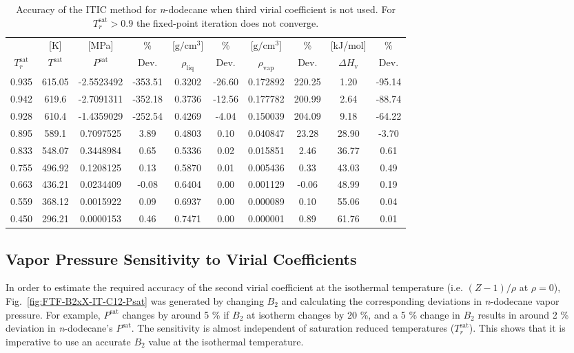 \documentclass[5p,times]{elsarticle}
\begin{document}
\begin{table}[]
\centering
\caption{Accuracy of the ITIC method for \textit{n}-dodecane when third virial coefficient is not used. For $T_r^{\mathrm{sat}}>0.9$ the fixed-point iteration does not converge.}
\label{tab:NIST-VAL-C12-FTF}
\begin{tabular}{cccccccccc}
 & {[}K{]} &	 {[}MPa{]} &	 \% 	& {[}$\mathrm{g/cm^3}${]} & \% & {[}$\mathrm{g/cm^3}${]} & \% 	& {[}kJ/mol{]} & \% \\
$T_r^{\mathrm{sat}}$ & $T^{\mathrm{sat}}$ & $P^{\mathrm{sat}}$ & Dev. & $\rho_{\mathrm{liq}}$ &	 Dev. & $\rho_{\mathrm{vap}}$ & Dev. & $\Delta H_{\mathrm{v}}$ & Dev. \\
\hline
0.935 & 615.05 & -2.5523492 & -353.51 & 0.3202 & -26.60 & 0.172892 & 220.25 & 1.20  & -95.14 \\
0.942 & 619.6  & -2.7091311 & -352.18 & 0.3736 & -12.56 & 0.177782 & 200.99 & 2.64  & -88.74 \\
0.928 & 610.4  & -1.4359029 & -252.54 & 0.4269 & -4.04  & 0.150039 & 204.09 & 9.18  & -64.22 \\
0.895 & 589.1  & 0.7097525  & 3.89    & 0.4803 & 0.10   & 0.040847 & 23.28  & 28.90 & -3.70  \\
0.833 & 548.07 & 0.3448984  & 0.65    & 0.5336 & 0.02   & 0.015851 & 2.46   & 36.77 & 0.61   \\
0.755 & 496.92 & 0.1208125  & 0.13    & 0.5870 & 0.01   & 0.005436 & 0.33   & 43.03 & 0.49   \\
0.663 & 436.21 & 0.0234409  & -0.08   & 0.6404 & 0.00   & 0.001129 & -0.06  & 48.99 & 0.19   \\
0.559 & 368.12 & 0.0015922  & 0.09    & 0.6937 & 0.00   & 0.000089 & 0.10   & 55.06 & 0.04   \\
0.450 & 296.21 & 0.0000153  & 0.46    & 0.7471 & 0.00   & 0.000001 & 0.89   & 61.76 & 0.01  \\
\end{tabular}

\end{table}

\subsection{Vapor Pressure Sensitivity to Virial Coefficients} \label{sec:Bx-Sensitivity}
In order to estimate the required accuracy of the second virial coefficient at the isothermal temperature (i.e. $(Z-1)/\rho$ at $\rho=0$), Fig.~\ref{fig:FTF-B2xX-IT-C12-Psat} was generated by changing $B_2$ and calculating the corresponding deviations in \textit{n}-dodecane vapor pressure. For example, $P^{\mathrm{sat}}$ changes by around 5 \% if $B_2$ at isotherm changes by 20 \%, and a 5 \% change in $B_2$ results in around 2 \% deviation in \textit{n}-dodecane's $P^{\mathrm{sat}}$. The sensitivity is almost independent of saturation reduced temperatures ($T_r^{\mathrm{sat}}$). This shows that it is imperative to use an accurate $B_2$ value at the isothermal temperature.
\end{document}
